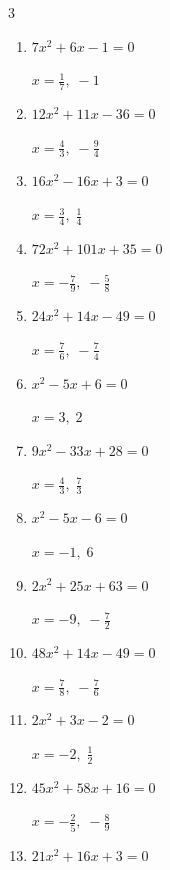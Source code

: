 \begin{multicols}{3}
\begin{enumerate}
        $\displaystyle x=\frac{1}{3},\; \frac{9}{5}$

  \item $7x^{2}+6x-1=0$

        $\displaystyle x=\frac{1}{7},\; -1$

  \item $12x^{2}+11x-36=0$

        $\displaystyle x=\frac{4}{3},\; -\frac{9}{4}$

  \item $16x^{2}-16x+3=0$

        $\displaystyle x=\frac{3}{4},\; \frac{1}{4}$

  \item $72x^{2}+101x+35=0$

        $\displaystyle x=-\frac{7}{9},\; -\frac{5}{8}$

  \item $24x^{2}+14x-49=0$

        $\displaystyle x=\frac{7}{6},\; -\frac{7}{4}$

\columnbreak %

\resetques

  \item $x^{2}-5x+6=0$

        $\displaystyle x=3,\; 2$

  \item $9x^{2}-33x+28=0$

        $\displaystyle x=\frac{4}{3},\; \frac{7}{3}$

  \item $x^{2}-5x-6=0$

        $\displaystyle x=-1,\; 6$

  \item $2x^{2}+25x+63=0$

        $\displaystyle x=-9,\; -\frac{7}{2}$

  \item $48x^{2}+14x-49=0$

        $\displaystyle x=\frac{7}{8},\; -\frac{7}{6}$

  \item $2x^{2}+3x-2=0$

        $\displaystyle x=-2,\; \frac{1}{2}$

  \item $45x^{2}+58x+16=0$

        $\displaystyle x=-\frac{2}{5},\; -\frac{8}{9}$

  \item $21x^{2}+16x+3=0$


\end{enumerate}
\end{multicols}
